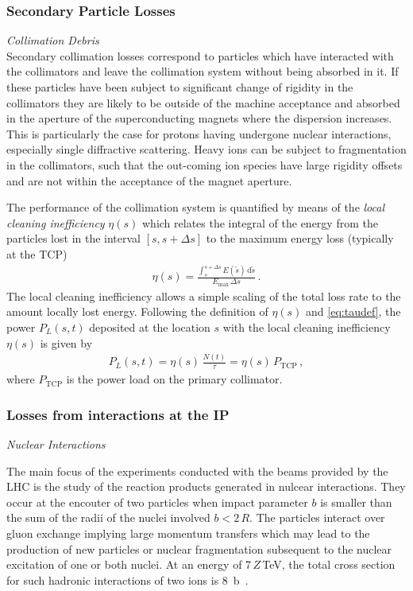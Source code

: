 \subsubsection{Secondary Particle Losses}

%
\textit{Collimation Debris} 
\\
Secondary collimation losses correspond to particles which have interacted with the collimators and  leave the collimation system without being absorbed in it. If these particles have been subject to significant change of rigidity in the collimators they are likely to be outside of the machine acceptance and absorbed in the aperture of the superconducting magnets where the dispersion increases. This is particularly the case for protons having undergone nuclear interactions, especially single diffractive scattering. Heavy ions can be subject to fragmentation in the collimators, such that the out-coming ion species have large rigidity offsets and are not within the acceptance of the magnet aperture.

The performance of the collimation system is quantified by means of the \textit{local cleaning inefficiency} $\eta(s)$ which relates the integral of the energy from the particles lost in the interval $[s,s+\Delta s]$ to the maximum energy loss (typically at the TCP)
%
\begin{align}
  \eta(s) = \frac{\int_s^{s+\Delta s} E(\tilde{s}) \, \mathrm{d} \tilde{s} }{E_\text{max} \, \Delta s} \, .
\end{align}
%
%
The local cleaning inefficiency allows a simple scaling of the total loss rate to the amount locally lost energy. Following the definition of $\eta(s)$ and \eqref{eq:taudef}, the power $P_L(s,t)$ deposited at the location $s$ with the local cleaning inefficiency $\eta(s)$ is given by
%
%
\begin{align}
  P_L(s,t) = \eta(s) \, \frac{N(t)}{\tau} = \eta(s) \, P_\text{TCP} \, ,
\end{align}
%
where $P_\text{TCP}$ is the power load on the primary collimator.

%
\subsubsection{Losses from interactions at the IP} \label{interactionIP}



\textit{Nuclear Interactions} 

The main focus of the experiments conducted with the beams provided by the LHC is the study of the reaction products generated in nulcear interactions. They occur at the encouter of two particles when impact parameter $b$ is smaller than the sum of the radii of the nuclei involved $b<2\,R$. The particles interact over gluon exchange implying large momentum transfers which may lead to the production of new particles or nuclear fragmentation subsequent to the nuclear excitation of one or both nuclei. At an energy of 7$\,Z\,$TeV, the total cross section for such hadronic interactions of two \lead ions is 8~b~\cite{}. 


